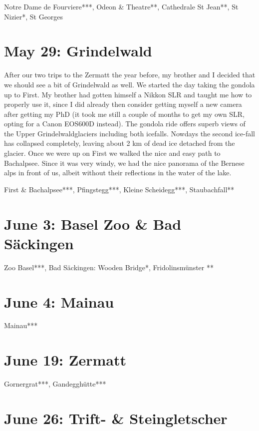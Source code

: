Notre Dame de Fourviere***, Odeon \& Theatre**, Cathedrale St Jean**, St Nizier*, St Georges

\section{May 29: Grindelwald}
\label{Grindelwald2011}

After our two trips to the Zermatt the year before, my brother and I decided that we should see a bit of Grindelwald as well. We started the day taking the gondola up to First. My brother had gotten himself a Nikkon SLR and taught me how to properly use it, since I did already then consider getting myself a new camera after getting my PhD (it took me still a couple of months to get my own SLR, opting for a Canon EOS600D instead). The gondola ride offers superb views of the Upper Grindelwaldglaciers including both icefalls. Nowdays the second ice-fall has collapsed completely, leaving about 2 km of dead ice detached from the glacier. Once we were up on First we walked the nice and easy path to Bachalpsee. Since it was very windy, we had the nice panorama of the Bernese alps in front of us, albeit without their reflections in the water of the lake. 

First \& Bachalpsee***, Pfingstegg***, Kleine Scheidegg***, Staubachfall**

\section{June 3: Basel Zoo \& Bad S\"ackingen}
\label{Basel2011}

Zoo Basel***, Bad S\"ackingen: Wooden Bridge*, Fridolinsm\"unster **

\section{June 4: Mainau}
\label{Mainau2011}

Mainau***

\section{June 19: Zermatt}
\label{Zermatt2011}

Gornergrat***, Gandeggh\"utte***

\section{June 26: Trift- \& Steingletscher}
\label{Gadmen}

